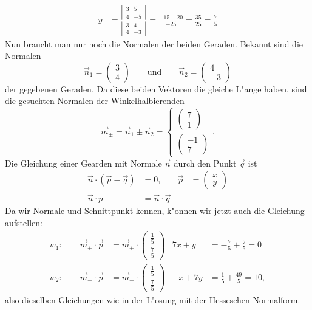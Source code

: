 \begin{loesung}
\begin{align*}
y&=\frac{\left|\,\begin{matrix}3&5\\4&-5\end{matrix}\,\right|}{\left|\,\begin{matrix}3&4\\4&-3\end{matrix}\,\right|}
=\frac{-15-20}{-25}=\frac{35}{25}=\frac75
\end{align*}
Nun braucht man nur noch die Normalen der beiden Geraden. Bekannt sind die Normalen
\[
\vec n_1=\begin{pmatrix}3\\4\end{pmatrix}
\qquad
\text{und}
\qquad
\vec n_2=\begin{pmatrix}4\\-3\end{pmatrix}
\]
der gegebenen Geraden. Da diese beiden Vektoren die gleiche L"ange haben,
sind die gesuchten Normalen der Winkelhalbierenden
\[
\vec m_{\pm}=\vec n_1\pm \vec n_2=\begin{cases}
\begin{pmatrix}7\\1\end{pmatrix}\\
\begin{pmatrix}-1\\7\end{pmatrix}
\end{cases}.
\]
Die Gleichung einer Gearden mit Normale $\vec n$ durch den Punkt $\vec q$ ist
\begin{align*}
\vec n\cdot(\vec p-\vec q)&=0,&\vec p&=\begin{pmatrix}x\\y\end{pmatrix}
\\
\vec n\cdot p&=\vec n\cdot\vec q
\end{align*}
Da wir Normale und Schnittpunkt kennen, k"onnen wir jetzt auch die Gleichung
aufstellen:
\begin{align*}
w_1:\qquad \vec m_+\cdot\vec p&=\vec m_+\cdot\begin{pmatrix}\frac15\\\frac75\end{pmatrix}&
   7x+y&=-\frac75+\frac{7}5=0
\\
w_2:\qquad\vec m_-\cdot\vec p&=\vec m_-\cdot\begin{pmatrix}\frac15\\\frac75\end{pmatrix}&
   -x+7y&=\frac15+\frac{49}5=10,
\end{align*}
also dieselben Gleichungen wie in der L"osung mit der Hesseschen Normalform.


\end{loesung}

